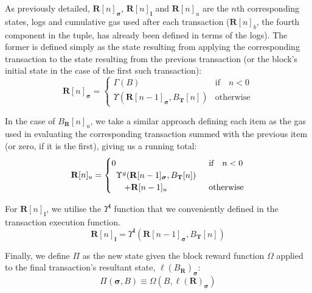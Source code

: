 \documentclass[9pt,oneside]{amsart}
\begin{document}
\begin{multicols}{2}
As previously detailed, $\mathbf{R}[n]_{\boldsymbol{\sigma}}$, $\mathbf{R}[n]_\mathbf{l}$ and $\mathbf{R}[n]_u$ are the $n$th corresponding states, logs and cumulative gas used after each transaction ($\mathbf{R}[n]_b$, the fourth component in the tuple, has already been defined in terms of the logs). The former is defined simply as the state resulting from applying the corresponding transaction to the state resulting from the previous transaction (or the block's initial state in the case of the first such transaction):
\begin{equation}
\mathbf{R}[n]_{\boldsymbol{\sigma}} = \begin{cases} \Gamma(B) & \text{if} \quad n < 0 \\ \Upsilon(\mathbf{R}[n - 1]_{\boldsymbol{\sigma}}, B_\mathbf{T}[n]) & \text{otherwise} \end{cases}
\end{equation}

In the case of $B_\mathbf{R}[n]_u$, we take a similar approach defining each item as the gas used in evaluating the corresponding transaction summed with the previous item (or zero, if it is the first), giving us a running total:
\begin{equation}
\mathbf{R}[n]_u = \begin{cases} 0 & \text{if} \quad n < 0 \\
\begin{array}[b]{l}
\Upsilon^g(\mathbf{R}[n - 1]_{\boldsymbol{\sigma}}, B_\mathbf{T}[n])\\ \quad + \mathbf{R}[n-1]_u
\end{array}
 & \text{otherwise} \end{cases}
\end{equation}

For $\mathbf{R}[n]_\mathbf{l}$, we utilise the $\Upsilon^\mathbf{l}$ function that we conveniently defined in the transaction execution function.
\begin{equation}
\mathbf{R}[n]_\mathbf{l} =
\Upsilon^\mathbf{l}(\mathbf{R}[n - 1]_{\boldsymbol{\sigma}}, B_\mathbf{T}[n])
\end{equation}

Finally, we define $\Pi$ as the new state given the block reward function $\Omega$ applied to the final transaction's resultant state, $\ell(B_\mathbf{R})_{\boldsymbol{\sigma}}$:
\begin{equation}
\Pi(\boldsymbol{\sigma}, B) \equiv \Omega(B, \ell(\mathbf{R})_{\boldsymbol{\sigma}})
\end{equation}


\end{multicols}
\end{document}
